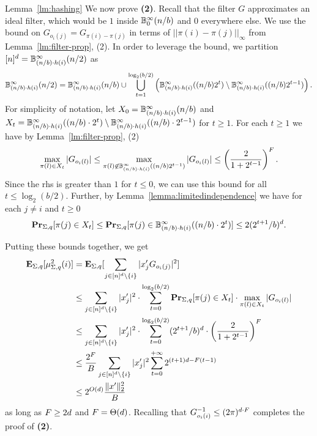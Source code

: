 \begin{proofof}{Lemma~\ref{lm:hashing}}
We now prove {\bf (2)}.  Recall that the filter $G$ approximates an ideal filter, which would be $1$ inside $\B^\infty_{0}(n/b)$ and $0$ everywhere else. We use the bound on $G_{o_i(j)}=G_{\pi(i)-\pi(j)}$ in terms of $||\pi(i)-\pi(j)||_\infty$ from Lemma~\ref{lm:filter-prop}, (2). In order to leverage the bound, we partition $\nsq=\B^\infty_{(n/b)\cdot h(i)}(n/2)$ as 
$$
\B^\infty_{(n/b)\cdot h(i)}(n/2)=\B^\infty_{(n/b)\cdot h(i)}(n/b)\cup \bigcup_{t=1}^{\log_2 (b/2)}  \left(\B^\infty_{(n/b)\cdot h(i)}((n/b)2^{t})\setminus \B^\infty_{(n/b)\cdot h(i)}((n/b)2^{t-1})\right).
$$
For simplicity of notation, let $X_0=\B^\infty_{(n/b)\cdot h(i)}(n/b)$ and $X_t=\B^\infty_{(n/b)\cdot h(i)}((n/b)\cdot 2^{t})\setminus \B^\infty_{(n/b)\cdot h(i)}((n/b)\cdot 2^{t-1})$ for $t\geq 1$.
For each $t\geq 1$ we have by Lemma~\ref{lm:filter-prop}, (2) 
$$
\max_{\pi(l)\in X_t} |G_{o_i(l)}|\leq \max_{\pi(l)\not \in  \B^\infty_{(n/b)\cdot h(i)}((n/b)2^{t-1})} |G_{o_i(l)}| \leq \left(\frac{2}{1+2^{t-1}}\right)^{\fc}.
$$
Since the rhs is greater than $1$ for $t\leq 0$, we can use this bound for all $t\leq \log_2 (b/2)$.
Further, by Lemma~\ref{lemma:limitedindependence} we have for each $j\neq i$  and $t\geq 0$
$$
\prob_{\Sigma, q}[\pi(j)\in X_t]\leq \prob_{\Sigma, q}[\pi(j)\in \B^\infty_{(n/b)\cdot h(i)}((n/b)\cdot 2^{t})]\leq 2(2^{t+1}/b)^{d}.
$$

Putting these bounds together, we get
\begin{equation*}
\begin{split}
\expect_{\Sigma, q}[\mu^2_{\Sigma, q}(i)]&=\expect_{\Sigma, q}[\sum_{j \in \nsq\setminus \{i\}} \abs{x'_j G_{o_i(j)}}^2] \\
&\leq \sum_{j\in \nsq\setminus \{i\}}  \abs{x'_j}^2 \cdot \sum_{t=0}^{\log_2 (b/2)} \prob_{\Sigma, q}[\pi(j)\in X_t]\cdot \max_{\pi(l)\in X_t} |G_{o_i(l)}|\\
&\leq \sum_{j\in \nsq\setminus \{i\}}  \abs{x'_j}^2 \cdot \sum_{t=0}^{\log_2 (b/2)} (2^{t+1}/b)^{d}\cdot \left(\frac{2}{1+2^{t-1}}\right)^{\fc}\\
&\leq \frac{2^\fc}{B}\sum_{j\in \nsq\setminus \{i\}} \abs{x'_j}^2 \sum_{t=0}^{+\infty}  2^{(t+1)d-\fc (t-1)}\\
& \leq 2^{O(d)} \frac{\norm{2}{x'}^2}{B}
\end{split}
\end{equation*}
as long as $\fc\geq 2d$ and $\fc=\Theta(d)$. Recalling that $G_{o_i(i)}^{-1}\leq \GS$ completes the proof of {\bf (2)}.



\end{proofof}
